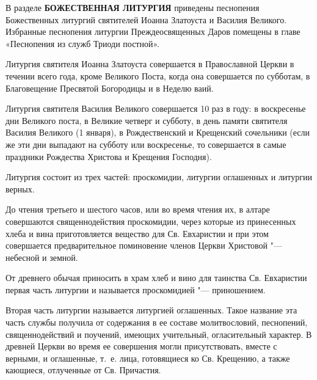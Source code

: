 

\label{_content_Liturgiya}

В разделе {\bfseries БОЖЕСТВЕННАЯ ЛИТУРГИЯ} приведены песнопения Божественных литургий святителей Иоанна Златоуста и Василия Великого. Избранные песнопения литургии Преждеосвященных Даров помещены в главе «Песнопения из служб Триоди постной».

Литургия святителя Иоанна Златоуста совершается в Православной Церкви в течении всего года, кроме Великого Поста, когда она совершается по субботам, в Благовещение Пресвятой Богородицы и в Неделю ваий.

Литургия святителя Василия Великого совершается 10 раз в году: в воскресенье дни Великого поста, в Великие четверг и субботу, в день памяти святителя Василия Великого (1 января), в Рождественский и Крещенский сочельники (если же эти дни выпадают на субботу или воскресенье, то совершается в самые праздники Рождества Христова и Крещения Господня).

Литургия состоит из трех частей: проскомидии, литургии оглашенных и литургии верных.


До чтения третьего и шестого часов, или во время чтения их, в алтаре совершаются священнодействия проскомидии, через которые из принесенных хлеба и вина приготовляется вещество для Св. Евхаристии и при этом совершается предварительное поминовение членов Церкви Христовой "--- небесной и земной.

От древнего обычая приносить в храм хлеб и вино для таинства Св. Евхаристии первая часть литургии и называется проскомидией "--- приношением.

\mychapterending


Вторая часть литургии называется литургией оглашенных. Такое название эта часть службы получила от содержания в ее составе молитвословий, песнопений, священнодействий и поучений, имеющих учительный, огласительный характер. В древней Церкви во время ее совершения могли присутствовать, вместе с верными, и оглашенные, т.~е. лица, готовящиеся ко Св. Крещению, а также кающиеся, отлученные от Св. Причастия.

